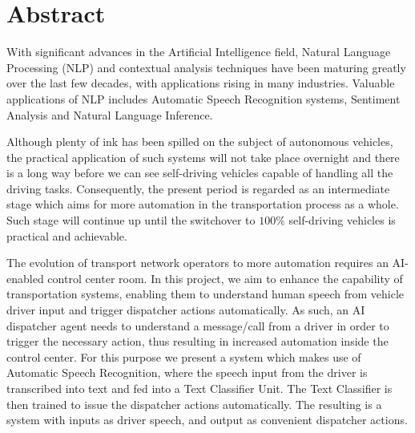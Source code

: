 \chapter*{Abstract}
\label{chap:abstract}
With significant advances in the Artificial Intelligence field, Natural Language Processing (NLP) and contextual analysis techniques have been maturing greatly over the last few decades, with applications rising in many industries. Valuable applications of NLP includes Automatic Speech Recognition systems, Sentiment Analysis and Natural Language Inference.

Although plenty of ink has been spilled on the subject of autonomous vehicles, the practical application of such systems will not take place overnight and there is a long way before we can see self-driving vehicles capable of handling all the driving tasks. Consequently, the present period is regarded as an intermediate stage which aims for more automation in the transportation process as a whole. Such stage will continue up until the switchover to $100\%$ self-driving vehicles is practical and achievable. 

The evolution of transport network operators to more automation requires an AI-enabled control center room. In this project, we aim to enhance the capability of transportation systems, enabling them to understand human speech from vehicle driver input and trigger dispatcher actions automatically. As such, an AI dispatcher agent needs to understand a message/call from a driver in order to trigger the necessary action, thus resulting in increased automation inside the control center. For this purpose we present a system which makes use of Automatic Speech Recognition, where the speech input from the driver is transcribed into text and fed into a Text Classifier Unit. The Text Classifier is then trained to issue the dispatcher actions automatically. The resulting is a system with inputs as driver speech, and output as convenient dispatcher actions.
